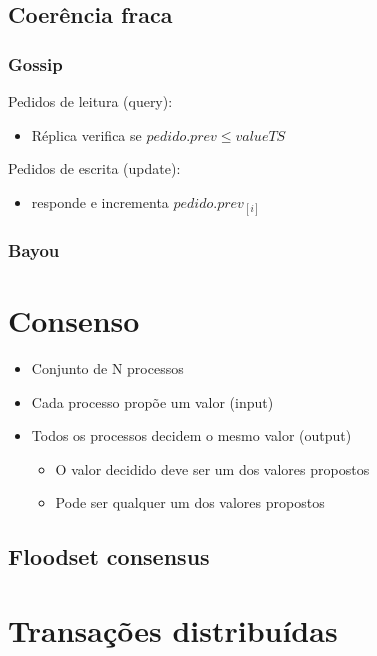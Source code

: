 \documentclass[12pt]{article}
\begin{document}
\subsection{Coerência fraca}

\subsubsection{Gossip}

Pedidos de leitura (query):
\begin{itemize}
    \item Réplica verifica se $pedido.prev \leq valueTS$
\end{itemize}

Pedidos de escrita (update):
\begin{itemize}
    \item responde e incrementa $pedido.prev_{[i]}$
\end{itemize}


\subsubsection{Bayou}

\newpage

\section{Consenso}

\begin{itemize}
    \item Conjunto de N processos
    \item Cada processo propõe um valor (input)
    \item Todos os processos decidem o mesmo valor (output)
    \begin{itemize}
        \item O valor decidido deve ser um dos valores propostos
        \item Pode ser qualquer um dos valores propostos
    \end{itemize}
\end{itemize}

\subsection{Floodset consensus}

\newpage

\section{Transações distribuídas}
\end{document}
